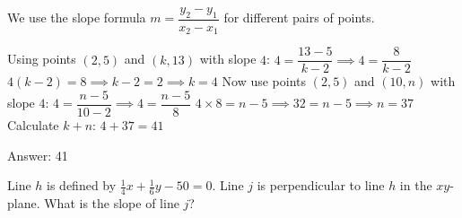 \documentclass[11pt,paper=a4,answers]{exam}
\begin{document}
\begin{questions}
\begin{solution}
We use the slope formula $m = \dfrac{y_2 - y_1}{x_2 - x_1}$ for different pairs of points.
\vspace{5pt}
\begin{center}
Using points $(2, 5)$ and $(k, 13)$ with slope $4$:
\vspace{5pt}
$4 = \dfrac{13 - 5}{k - 2} \implies 4 = \dfrac{8}{k - 2}$
\vspace{5pt}
$4(k - 2) = 8 \implies k - 2 = 2 \implies k = 4$
\vspace{10pt}
Now use points $(2, 5)$ and $(10, n)$ with slope $4$:
\vspace{5pt}
$4 = \dfrac{n - 5}{10 - 2} \implies 4 = \dfrac{n - 5}{8}$
\vspace{5pt}
$4 \times 8 = n - 5 \implies 32 = n - 5 \implies n = 37$
\vspace{10pt}
Calculate $k + n$:
\vspace{5pt}
$4 + 37 = 41$
\end{center}
\vspace{5pt}
Answer: \colorbox{yellow!100}{41}
\end{solution}

\vspace{1cm}

\question
\begin{center}
\end{center}
Line $h$ is defined by $\frac{1}{4}x + \frac{1}{6}y - 50 = 0$. Line $j$ is perpendicular to line $h$ in the $xy$-plane. What is the slope of line $j$?


\end{questions}
\end{document}
